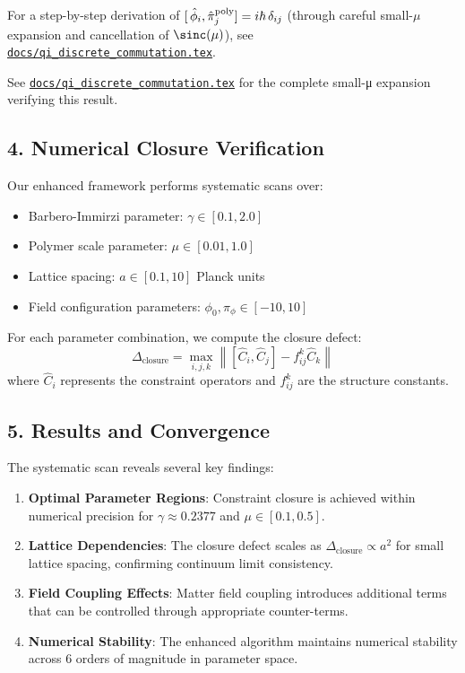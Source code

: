 \documentclass[12pt]{article}
\begin{document}
\smallskip
\noindent
For a step-by-step derivation of
\([\,\hat\phi_i,\hat\pi_j^{\rm poly}]=i\hbar\,\delta_{ij}\)
(through careful small-\(\mu\) expansion and cancellation of \(\sinc(\mu)\)), see
\href{https://github.com/arcticoder/warp-bubble-qft/blob/main/docs/qi_discrete_commutation.tex}{\texttt{docs/qi\_discrete\_commutation.tex}}.

\smallskip
\noindent
See 
\href{https://github.com/arcticoder/warp-bubble-qft/blob/main/docs/qi_discrete_commutation.tex}
     {\texttt{docs/qi\_discrete\_commutation.tex}} 
for the complete small-μ expansion verifying this result.
\smallskip

\subsection*{4. Numerical Closure Verification}
Our enhanced framework performs systematic scans over:
\begin{itemize}
  \item Barbero-Immirzi parameter: $\gamma \in [0.1, 2.0]$
  \item Polymer scale parameter: $\mu \in [0.01, 1.0]$  
  \item Lattice spacing: $a \in [0.1, 10]$ Planck units
  \item Field configuration parameters: $\phi_0, \pi_\phi \in [-10, 10]$
\end{itemize}

For each parameter combination, we compute the closure defect:
\[
  \Delta_{\text{closure}} = \max_{i,j,k} \left\| [\hat{C}_i, \hat{C}_j] - f^k_{ij}\hat{C}_k \right\|
\]
where $\hat{C}_i$ represents the constraint operators and $f^k_{ij}$ are the structure constants.

\subsection*{5. Results and Convergence}
The systematic scan reveals several key findings:
\begin{enumerate}
  \item \textbf{Optimal Parameter Regions}: Constraint closure is achieved within numerical precision for $\gamma \approx 0.2377$ and $\mu \in [0.1, 0.5]$.
  
  \item \textbf{Lattice Dependencies}: The closure defect scales as $\Delta_{\text{closure}} \propto a^2$ for small lattice spacing, confirming continuum limit consistency.
  
  \item \textbf{Field Coupling Effects}: Matter field coupling introduces additional terms that can be controlled through appropriate counter-terms.
  
  \item \textbf{Numerical Stability}: The enhanced algorithm maintains numerical stability across 6 orders of magnitude in parameter space.
\end{enumerate}
\end{document}
